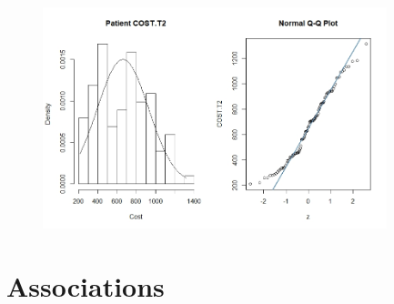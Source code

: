 \documentclass[]{article}
\begin{document}
\begin{figure}[H]
\centering
\includegraphics[width=10cm]{RStudio/jpeg/Norm_T2.jpeg}
\end{figure}

\section{Associations}
\end{document}

